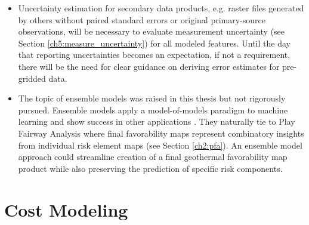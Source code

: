 \begin{itemize}
    \item Uncertainty estimation for secondary data products, e.g. raster files generated by others without paired standard errors or original primary-source observations, will be necessary to evaluate measurement uncertainty (see Section \ref{ch5:measure_uncertainty}) for all modeled features. Until the day that reporting uncertainties becomes an expectation, if not a requirement, there will be the need for clear guidance on deriving error estimates for pre-gridded data.
    \item The topic of ensemble models was raised in this thesis but not rigorously pursued. Ensemble models apply a model-of-models paradigm to machine learning and show success in other applications \citep[e.g.,][]{wilson_machine_2020}. They naturally tie to Play Fairway Analysis where final favorability maps represent combinatory insights from individual risk element maps (see Section \ref{ch2:pfa}). An ensemble model approach could streamline creation of a final geothermal favorability map product while also preserving the prediction of specific risk components.
\end{itemize}

\section{Cost Modeling}
\label{ch9:future_work_cm}


